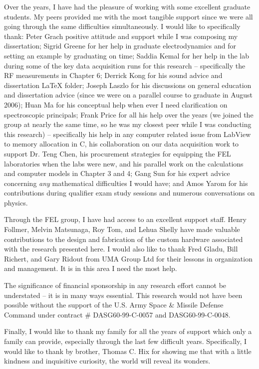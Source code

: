 \begin{acknowledgements}
Over the years, I have had the pleasure of working with some excellent graduate students. My peers provided me with the most tangible support since we were all going through the same difficulties simultaneously. I would like to specifically thank: Peter Grach positive attitude and support while I was composing my dissertation; Sigrid Greene for her help in graduate electrodynamics and for setting an example by graduating on time; Saddia Kemal for her help in the lab during some of the key data acquisition runs for this research -- specifically the RF measurements in Chapter 6; Derrick Kong for his sound advice and dissertation LaTeX folder; Joseph Laszlo for his discussions on general education and dissertation advice (since we were on a parallel course to graduate in August 2006); Huan Ma for his conceptual help when ever I need clarification on spectroscopic principals; Frank Price for all his help over the years (we joined the group at nearly the same time, so he was my closest peer while I was conducting this research) -- specifically his help in any computer related issue from LabView to memory allocation in C, his collaboration on our data acquisition work to support Dr. Teng Chen, his procurement strategies for equipping the FEL laboratories when the labs were new, and his parallel work on the calculations and computer models in Chapter 3 and 4; Gang Sun for his expert advice concerning \emph{any} mathematical difficulties I would have; and Amos Yarom for his contributions during qualifier exam study sessions and numerous conversations on physics.

Through the FEL group, I have had access to an excellent support staff. Henry Follmer, Melvin Matsunaga, Roy Tom, and Lehua Shelly have made valuable contributions to the design and fabrication of the custom hardware associated with the research presented here. I would also like to thank Fred Gladu, Bill Richert, and Gary Ridout from UMA Group Ltd for their lessons in organization and management. It is in this area I need the most help.

The significance of financial sponsorship in any research effort cannot be understated -- it is in many ways essential. This research would not have been possible without the support of the U.S. Army Space \& Missile Defense Command under contract \# DASG60-99-C-0057 and DASG60-99-C-0048.

Finally, I would like to thank my family for all the years of support which only a family can provide, especially through the last few difficult years. Specifically, I would like to thank by brother, Thomas C. Hix for showing me that with a little kindness and inquisitive curiosity, the world will reveal its wonders.

\end{acknowledgements}

